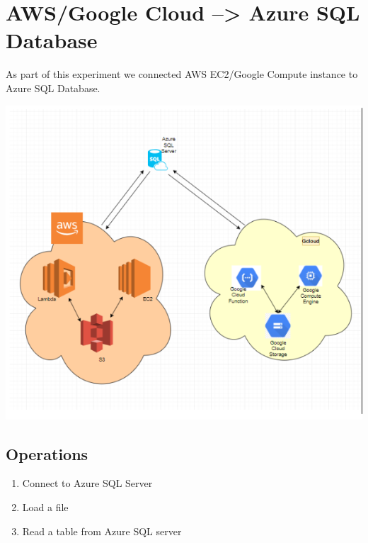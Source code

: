 \section{AWS/Google Cloud --> Azure SQL Database}
As part of this experiment we connected AWS EC2/Google Compute instance to Azure SQL Database.

\begin{center}
\includegraphics[scale=0.75]{figures/experiments/AWS_Google_to_AzureDB.png}
\end{center}

\subsection{Operations}
 \begin{enumerate} 
 	\item Connect to Azure SQL Server 
 	\item Load a file
 	\item Read a table from Azure SQL server 
 \end{enumerate}

